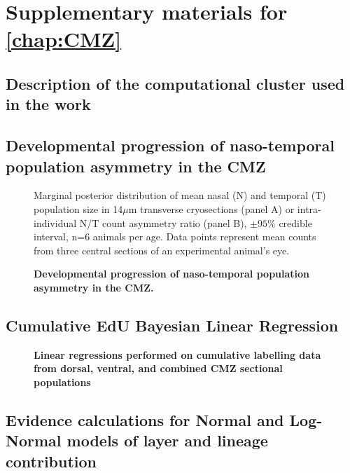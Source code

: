 \chapter{Supplementary materials for \autoref{chap:CMZ}}
\section{Description of the computational cluster used in the work}
\label{cluster}

\section{Developmental progression of naso-temporal population asymmetry in the CMZ}

\begin{figure}[!h]
    \caption{{\bf Developmental progression of naso-temporal population asymmetry in the CMZ.}}
    Marginal posterior distribution of mean nasal (N) and temporal (T) population size in 14$\mu$m transverse cryosections (panel A) or intra-individual N/T count asymmetry ratio (panel B), $\pm 95\%$ credible interval, n=6 animals per age. Data points represent mean counts from three central sections of an experimental animal's eye. 
    \label{NTontology}
\end{figure}

\FloatBarrier

\section{Cumulative EdU Bayesian Linear Regression}

\begin{figure}[!h]
    \caption{{\bf Linear regressions performed on cumulative labelling data from dorsal, ventral, and combined CMZ sectional populations}}
    \label{cumEdUlinreg}
\end{figure}

\FloatBarrier

\section{Evidence calculations for Normal and Log-Normal models of layer and lineage contribution}

